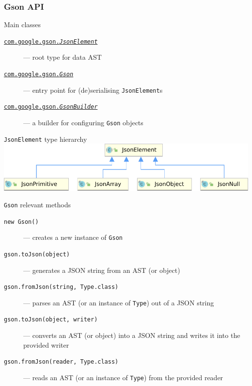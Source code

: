 \documentclass[presentation]{beamer}\mode<presentation>{\usetheme{AMSBolognaFC}}
\begin{document}
\begin{frame}[allowframebreaks]
    \frametitle{Gson API}

    \begin{block}{Main classes}
        \begin{description}
            \item[\href{https://www.javadoc.io/doc/com.google.code.gson/gson/latest/com.google.gson/com/google/gson/JsonElement.html}{\texttt{com.google.gson.\textit{JsonElement}}}] --- root type for data AST
            \item[\href{https://www.javadoc.io/doc/com.google.code.gson/gson/latest/com.google.gson/com/google/gson/Gson.html}{\texttt{com.google.gson.\textit{Gson}}}] --- entry point for (de)serialising \texttt{JsonElement}s
            \item[\href{https://www.javadoc.io/doc/com.google.code.gson/gson/latest/com.google.gson/com/google/gson/GsonBuilder.html}{\texttt{com.google.gson.\textit{GsonBuilder}}}] --- a builder for configuring \texttt{Gson} objects
        \end{description}
    \end{block}

    \begin{exampleblock}{\texttt{JsonElement} type hierarchy}
        \centering
        \includegraphics[width=.5\linewidth]{./figures/JsonElementCompact.pdf}
    \end{exampleblock}

    \begin{block}{\texttt{Gson} relevant methods}
        \begin{description}
            \item[\texttt{new Gson()}] --- creates a new instance of \texttt{Gson}
            \item[\texttt{gson.toJson(object)}] --- generates a JSON string from an AST (or object)
            \item[\texttt{gson.fromJson(string, Type.class)}] --- parses an AST (or an instance of \texttt{Type}) out of a JSON string
            \item[\texttt{gson.toJson(object, writer)}] --- converts an AST (or object) into a JSON string and writes it into the provided writer
            \item[\texttt{gson.fromJson(reader, Type.class)}] --- reads an AST (or an instance of \texttt{Type}) from the provided reader
        \end{description}
    \end{block}


\end{frame}
\end{document}
